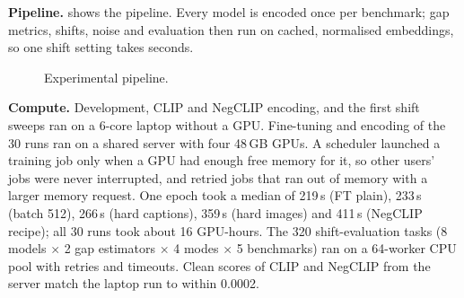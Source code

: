\documentclass{article}
\begin{document}
\textbf{Pipeline.}  shows the pipeline. Every model is encoded once per benchmark; gap metrics, shifts, noise and evaluation then run on cached, normalised embeddings, so one shift setting takes seconds.

\begin{figure}[H]
\begin{center}
\caption{Experimental pipeline.}
\label{fig:pipeline}
\end{center}
\end{figure}

\textbf{Compute.} Development, CLIP and NegCLIP encoding, and the first shift sweeps ran on a 6-core laptop without a GPU. Fine-tuning and encoding of the 30 runs ran on a shared server with four 48\,GB GPUs. A scheduler launched a training job only when a GPU had enough free memory for it, so other users' jobs were never interrupted, and retried jobs that ran out of memory with a larger memory request. One epoch took a median of 219\,s (FT plain), 233\,s (batch 512), 266\,s (hard captions), 359\,s (hard images) and 411\,s (NegCLIP recipe); all 30 runs took about 16 GPU-hours. The 320 shift-evaluation tasks (8 models $\times$ 2 gap estimators $\times$ 4 modes $\times$ 5 benchmarks) ran on a 64-worker CPU pool with retries and timeouts. Clean scores of CLIP and NegCLIP from the server match the laptop run to within 0.0002.
\end{document}
